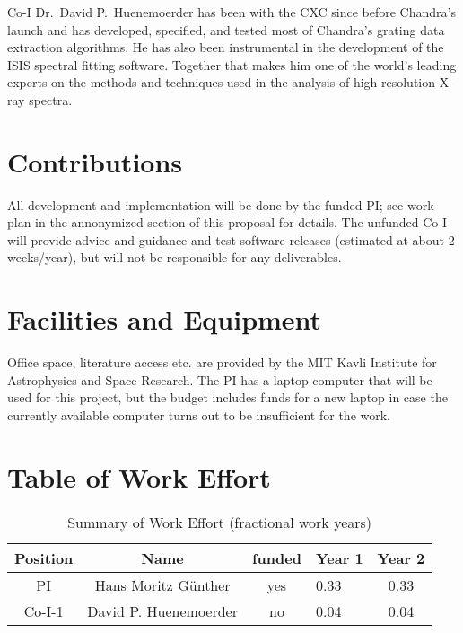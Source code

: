 \documentclass[fleqn,12pt,onecolumn]{SelfArx} %
\begin{document}
Co-I Dr.\ David P.\ Huenemoerder has been with the CXC since before Chandra's launch and has developed, specified, and tested most of Chandra's grating data extraction algorithms. He has also been instrumental in the development of the ISIS spectral fitting software. Together that makes him one of the world's leading experts on the methods and techniques used in the analysis of high-resolution X-ray spectra.


\section{Contributions}
All development and implementation will be done by the funded PI; see work plan in the annonymized section of this proposal for details. The unfunded Co-I will provide advice and guidance and test software releases (estimated at about 2 weeks/year), but will not be responsible for any deliverables.


\section{Facilities and Equipment}
Office space, literature access etc. are provided by the MIT Kavli Institute for Astrophysics and Space Research. The PI has a laptop computer that will be used for this project, but the budget includes funds for a new laptop in case the currently available computer turns out to be insufficient for the work.

\section{Table of Work Effort}
\begin{table}[htb]\small
    \centering
    \caption{Summary of Work Effort (fractional work years)}  \label{tbl:workeffort}
    \begin{tabular}{ccclc}\\\hline%
      \multicolumn{1}{c}{Position}&
      \multicolumn{1}{c}{Name}&
      \multicolumn{1}{c}{funded}&
      \multicolumn{1}{c}{Year 1}&
      \multicolumn{1}{c}{Year 2}\\\hline
      PI& Hans Moritz G\"unther & yes &
      0.33&    0.33\\
      Co-I-1& David P. Huenemoerder & no &
      0.04 & 0.04\\
    \end{tabular}
  \end{table}
\end{document}
